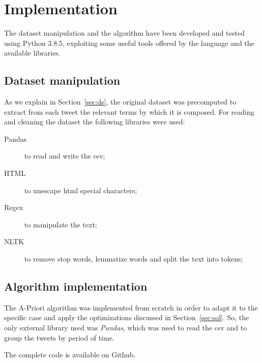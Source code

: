 \section{Implementation}
The dataset manipulation and the algorithm have been developed and 
tested using Python $3.8.5$,
exploiting some useful tools offered by the language and the available
libraries.

\subsection{Dataset manipulation}
As we explain in Section~\ref{sec:ds}, the original dataset was precomputed 
to extract from each tweet the relevant terms by which it is composed.
For reading and cleaning the dataset the following libraries were used:
\begin{description}
    \item[Pandas] to read and write the csv;
    \item[HTML] to unescape html special characters;
    \item[Regex] to manipulate the text;
    \item[NLTK] to remove stop words, lemmatize words and split the text into tokens;    
\end{description}

\subsection{Algorithm implementation}
The A-Priori algorithm was implemented from scratch in order to adapt it to the specific 
case and apply the optimizations discussed in Section~\ref{sec:sol}. So, 
the only external library used was \emph{Pandas}, which was used to read the 
csv and to group the tweets by period of time.

The complete code is available on Github.~\cite{code:github}

